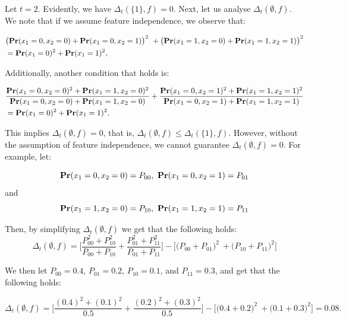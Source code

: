 \documentclass{article}
\newcommand{\mbf}[1]{\ensuremath\mathbf{#1}}
\begin{document}
Let $t = 2$. Evidently, we have $\Delta_{t}(\{1\},f) = 0$.
Next, let us analyse $\Delta_{t}(\emptyset,f)$.
We note that if we assume feature independence, we observe that:

\begin{equation*}
\begin{aligned}
&\bigl(\mbf{Pr}(x_1 = 0, x_2 = 0) + \mbf{Pr}(x_1 = 0, x_2 = 1)\bigr)^2 \ + \bigl(\mbf{Pr}(x_1 = 1, x_2 = 0) + \mbf{Pr}(x_1 = 1, x_2 = 1)\bigr)^2 \\
&= \mbf{Pr}(x_1 = 0)^2 + \mbf{Pr}(x_1 = 1)^2,
\end{aligned}
\end{equation*}

Additionally, another condition that holds is:

\begin{equation*}
\begin{aligned}
&\frac{\mbf{Pr}(x_1 = 0, x_2 = 0)^2 + \mbf{Pr}(x_1 = 1, x_2 = 0)^2}{\mbf{Pr}(x_1 = 0, x_2 = 0) + \mbf{Pr}(x_1 = 1, x_2 = 0)} + 
\frac{\mbf{Pr}(x_1 = 0, x_2 = 1)^2 + \mbf{Pr}(x_1 = 1, x_2 = 1)^2}{\mbf{Pr}(x_1 = 0, x_2 = 1) + \mbf{Pr}(x_1 = 1, x_2 = 1)} \\
&= \mbf{Pr}(x_1 = 0)^2 + \mbf{Pr}(x_1 = 1)^2.
\end{aligned}
\end{equation*}

This implies $\Delta_{t}(\emptyset,f) = 0$, that is, $\Delta_{t}(\emptyset,f) \le \Delta_{t}(\{1\},f)$. However, without the assumption of feature independence, we cannot guarantee $\Delta_{t}(\emptyset,f) = 0$. For example, let:

\[
\mbf{Pr}(x_1 = 0, x_2 = 0) = P_{00}, \
\mbf{Pr}(x_1 = 0, x_2 = 1) = P_{01}
\]
and 
\[
\mbf{Pr}(x_1 = 1, x_2 = 0) = P_{10}, \
\mbf{Pr}(x_1 = 1, x_2 = 1) = P_{11}
\]


Then, by simplifying $\Delta_{t}(\emptyset,f)$ we get that the following holds:
\begin{equation}
\Delta_{t}(\emptyset,f) = 
\Big[\frac{P_{00}^2 + P_{10}^2}{P_{00} + P_{10}} + \frac{P_{01}^2 + P_{11}^2}{P_{01} + P_{11}}\Bigr]
- \Big[\bigl(P_{00} + P_{01}\bigr)^2 \ + \bigl(P_{10} + P_{11}\bigr)^2\Bigr]
\end{equation}


We then let $P_{00} = 0.4$, $P_{01} = 0.2$, $P_{10} = 0.1$, and $P_{11} = 0.3$,
and get that the following holds:

\begin{equation}
\Delta_{t}(\emptyset,f) = 
\Big[\frac{(0.4)^2 + (0.1)^2}{0.5} + \frac{(0.2)^2 + (0.3)^2}{0.5}\Bigr]
- \Big[\bigl(0.4 + 0.2\bigr)^2 \ + \bigl(0.1 + 0.3\bigr)^2\Bigr]
= 0.08.
\end{equation}
\end{document}
